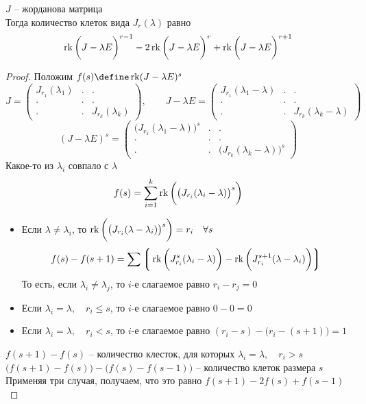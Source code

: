 \begin{theorem}
	$ J $ -- жорданова матрица \\
	Тогда количество клеток вида $ J_r(\lambda) $ равно
	$$ \operatorname{rk} \bigg( J - \lambda E \bigg)^{r - 1} - 2 \operatorname{rk} \bigg( J - \lambda E \bigg)^r + \operatorname{rk} \bigg( J - \lambda E \bigg)^{r + 1} $$
\end{theorem}

\begin{proof}
	Положим $ f(s) \define \rk (J - \lambda E)^s $
	$$ J =
	\begin{pmatrix}
		J_{r_1}(\lambda_1) & . & . \\
		. & . & . \\
		. & . & J_{r_k}(\lambda_k)
	\end{pmatrix}, \qquad J - \lambda E =
	\begin{pmatrix}
		J_{r_1}(\lambda_1 - \lambda) & . & . \\
		. & . & . \\
		. & . & J_{r_k}(\lambda_k - \lambda)
	\end{pmatrix} $$
	$$ (J - \lambda E)^s =
	\begin{pmatrix}
		\bigg( J_{r_1}(\lambda_1 - \lambda) \bigg)^s & . & . \\
		. & . & . \\
		. & . & \bigg( J_{r_k}(\lambda_k - \lambda) \bigg)^s
	\end{pmatrix} $$
	Какое-то из $ \lambda_i $ совпало с $ \lambda $
	$$ f(s) = \sum_{i = 1}^k \operatorname{rk} \bigg( \big( J_{r_i}(\lambda_i - \lambda) \big)^s \bigg) $$
	\begin{itemize}
		\item Если $ \lambda \ne \lambda_i $, то $ \operatorname{rk} \bigg( \big( J_{r_i}(\lambda - \lambda_i) \big)^s \bigg) = r_i \quad \forall s $
		$$ f(s) - f(s + 1) = \sum \bigg\lgroup \operatorname{rk} \bigg( J_{r_i}^s(\lambda_i - \lambda) \bigg) - \operatorname{rk} \bigg( J_{r_i}^{s + 1}(\lambda - \lambda_i) \bigg) \bigg\rgroup $$
		То есть, если $ \lambda_i \ne \lambda_j $, то $ i $-е слагаемое равно $ r_i - r_j = 0 $
		\item Если $ \lambda_i = \lambda, \quad r_i \le s $, то $ i $-е слагаемое равно $ 0 - 0 = 0 $
		\item Если $ \lambda_i = \lambda, \quad r_i < s $, то $ i $-е слагаемое равно $ (r_i - s) - \bigg( r_i - (s + 1) \bigg) = 1 $
	\end{itemize}
	$ f(s + 1) - f(s) $ -- количество клесток, для которых $ \lambda_i = \lambda, \quad r_i > s $ \\
	$ \bigg( f(s + 1) - f(s) \bigg) - \bigg( f(s) - f(s - 1) \bigg) $ -- количество клеток размера $ s $ \\
	Применяя три случая, получаем, что это равно $ f(s + 1) - 2f(s) + f(s - 1) $
\end{proof}

